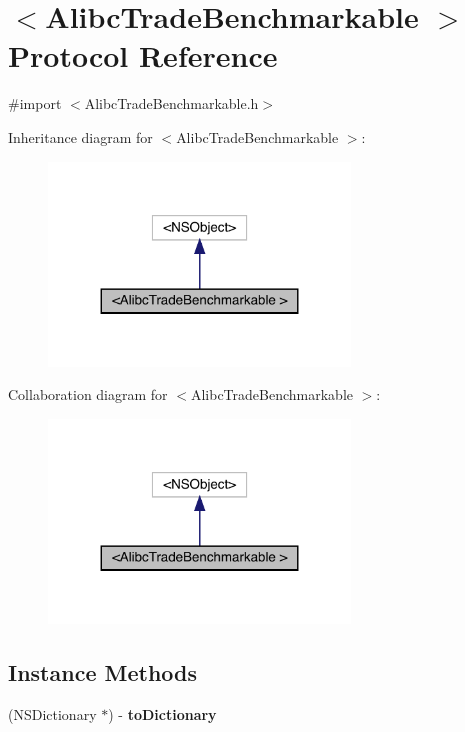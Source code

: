 \hypertarget{protocol_alibc_trade_benchmarkable_01-p}{}\section{$<$Alibc\+Trade\+Benchmarkable $>$ Protocol Reference}
\label{protocol_alibc_trade_benchmarkable_01-p}


{\ttfamily \#import $<$Alibc\+Trade\+Benchmarkable.\+h$>$}



Inheritance diagram for $<$Alibc\+Trade\+Benchmarkable $>$\+:\nopagebreak
\begin{figure}[H]
\begin{center}
\leavevmode
\includegraphics[width=227pt]{protocol_alibc_trade_benchmarkable_01-p__inherit__graph}
\end{center}
\end{figure}


Collaboration diagram for $<$Alibc\+Trade\+Benchmarkable $>$\+:\nopagebreak
\begin{figure}[H]
\begin{center}
\leavevmode
\includegraphics[width=227pt]{protocol_alibc_trade_benchmarkable_01-p__coll__graph}
\end{center}
\end{figure}
\subsection*{Instance Methods}
\begin{DoxyCompactItemize}
\item 
\mbox{\label{protocol_alibc_trade_benchmarkable_01-p_aaaffe57203a8a78df2f3417b9a3776d9}} 
(N\+S\+Dictionary $\ast$) -\/ {\bfseries to\+Dictionary}
\end{DoxyCompactItemize}
